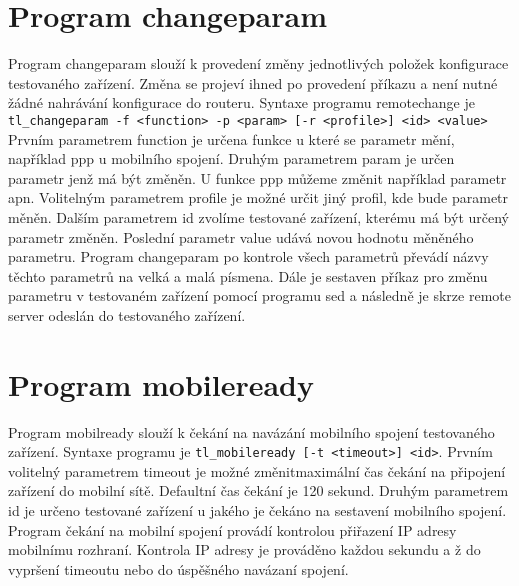 \section{Program changeparam}
Program changeparam slouží k provedení změny jednotlivých položek konfigurace testovaného zařízení. Změna se projeví ihned po provedení příkazu a není nutné žádné nahrávání konfigurace do routeru. Syntaxe programu remotechange je \texttt{tl\_changeparam -f <function> -p <param> [-r <profile>] <id> <value>} Prvním parametrem function je určena funkce u které se parametr mění, například ppp u mobilního spojení. Druhým parametrem param je určen parametr jenž má být změněn. U funkce ppp můžeme změnit například parametr apn. Volitelným parametrem profile je možné určit jiný profil, kde bude parametr měněn. Dalším parametrem id zvolíme testované zařízení, kterému má být určený parametr změněn. Poslední parametr value udává novou hodnotu měněného parametru. Program changeparam po kontrole všech parametrů převádí názvy těchto parametrů na velká a malá písmena. Dále je sestaven příkaz pro změnu parametru v testovaném zařízení pomocí programu sed a následně je skrze remote server odeslán do testovaného zařízení.

\section{Program mobileready}
Program mobilready slouží k čekání na navázání mobilního spojení testovaného zařízení. Syntaxe programu je \texttt{tl\_mobileready [-t <timeout>] <id>}. Prvním volitelný parametrem timeout je možné změnitmaximální čas čekání na připojení zařízení do mobilní sítě. Defaultní čas čekání je 120 sekund. Druhým parametrem id je určeno testované zařízení u jakého je čekáno na sestavení mobilního spojení. Program čekání na mobilní spojení provádí kontrolou přiřazení IP adresy mobilnímu rozhraní. Kontrola IP adresy je prováděno každou sekundu a ž do vypršení timeoutu nebo do úspěšného navázaní spojení. 

\endinput
